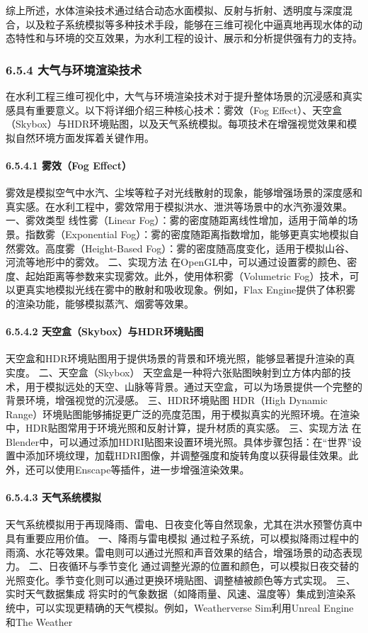 综上所述，水体渲染技术通过结合动态水面模拟、反射与折射、透明度与深度混合，以及粒子系统模拟等多种技术手段，能够在三维可视化中逼真地再现水体的动态特性和与环境的交互效果，为水利工程的设计、展示和分析提供强有力的支持。 \subsubsection{6.5.4 大气与环境渲染技术}\label{ux5927ux6c14ux4e0eux73afux5883ux6e32ux67d3ux6280ux672f} 在水利工程三维可视化中，大气与环境渲染技术对于提升整体场景的沉浸感和真实感具有重要意义。以下将详细介绍三种核心技术：雾效（Fog Effect）、天空盒（Skybox）与HDR环境贴图，以及天气系统模拟。每项技术在增强视觉效果和模拟自然环境方面发挥着关键作用。 \paragraph{6.5.4.1 雾效（Fog Effect）}\label{ux96feux6548fog-effect} 雾效是模拟空气中水汽、尘埃等粒子对光线散射的现象，能够增强场景的深度感和真实感。在水利工程中，雾效常用于模拟洪水、泄洪等场景中的水汽弥漫效果。 一、雾效类型 线性雾（Linear Fog）：雾的密度随距离线性增加，适用于简单的场景。指数雾（Exponential Fog）：雾的密度随距离指数增加，能够更真实地模拟自然雾效。高度雾（Height-Based Fog）：雾的密度随高度变化，适用于模拟山谷、河流等地形中的雾效。 二、实现方法 在OpenGL中，可以通过设置雾的颜色、密度、起始距离等参数来实现雾效。此外，使用体积雾（Volumetric Fog）技术，可以更真实地模拟光线在雾中的散射和吸收现象。例如，Flax Engine提供了体积雾的渲染功能，能够模拟蒸汽、烟雾等效果。 \paragraph{6.5.4.2 天空盒（Skybox）与HDR环境贴图}\label{ux5929ux7a7aux76d2skyboxux4e0ehdrux73afux5883ux8d34ux56fe} 天空盒和HDR环境贴图用于提供场景的背景和环境光照，能够显著提升渲染的真实度。 二、天空盒（Skybox） 天空盒是一种将六张贴图映射到立方体内部的技术，用于模拟远处的天空、山脉等背景。通过天空盒，可以为场景提供一个完整的背景环境，增强视觉的沉浸感。 三、HDR环境贴图 HDR（High Dynamic Range）环境贴图能够捕捉更广泛的亮度范围，用于模拟真实的光照环境。在渲染中，HDR贴图常用于环境光照和反射计算，提升材质的真实感。 三、实现方法 在Blender中，可以通过添加HDRI贴图来设置环境光照。具体步骤包括：在``世界''设置中添加环境纹理，加载HDRI图像，并调整强度和旋转角度以获得最佳效果。此外，还可以使用Enscape等插件，进一步增强渲染效果。 \paragraph{6.5.4.3 天气系统模拟}\label{ux5929ux6c14ux7cfbux7edfux6a21ux62df} 天气系统模拟用于再现降雨、雷电、日夜变化等自然现象，尤其在洪水预警仿真中具有重要应用价值。 一、降雨与雷电模拟 通过粒子系统，可以模拟降雨过程中的雨滴、水花等效果。雷电则可以通过光照和声音效果的结合，增强场景的动态表现力。 二、日夜循环与季节变化 通过调整光源的位置和颜色，可以模拟日夜交替的光照变化。季节变化则可以通过更换环境贴图、调整植被颜色等方式实现。 三、实时天气数据集成 将实时的气象数据（如降雨量、风速、温度等）集成到渲染系统中，可以实现更精确的天气模拟。例如，Weatherverse Sim利用Unreal Engine和The Weather 